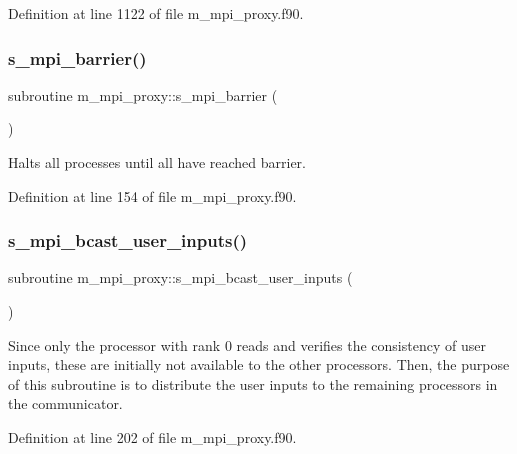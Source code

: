 Definition at line 1122 of file m\+\_\+mpi\+\_\+proxy.\+f90.

\mbox{\label{namespacem__mpi__proxy_abfbc42cea69273bc9fa4a2d78f636eb1}} 
\subsubsection{\texorpdfstring{s\+\_\+mpi\+\_\+barrier()}{s\_mpi\_barrier()}}
{\footnotesize\ttfamily subroutine m\+\_\+mpi\+\_\+proxy\+::s\+\_\+mpi\+\_\+barrier (\begin{DoxyParamCaption}{ }\end{DoxyParamCaption})}



Halts all processes until all have reached barrier. 



Definition at line 154 of file m\+\_\+mpi\+\_\+proxy.\+f90.

\mbox{\label{namespacem__mpi__proxy_a69660c5fe9302a8c0496b622fa3b5286}} 
\subsubsection{\texorpdfstring{s\+\_\+mpi\+\_\+bcast\+\_\+user\+\_\+inputs()}{s\_mpi\_bcast\_user\_inputs()}}
{\footnotesize\ttfamily subroutine m\+\_\+mpi\+\_\+proxy\+::s\+\_\+mpi\+\_\+bcast\+\_\+user\+\_\+inputs (\begin{DoxyParamCaption}{ }\end{DoxyParamCaption})}



Since only the processor with rank 0 reads and verifies the consistency of user inputs, these are initially not available to the other processors. Then, the purpose of this subroutine is to distribute the user inputs to the remaining processors in the communicator. 



Definition at line 202 of file m\+\_\+mpi\+\_\+proxy.\+f90.

